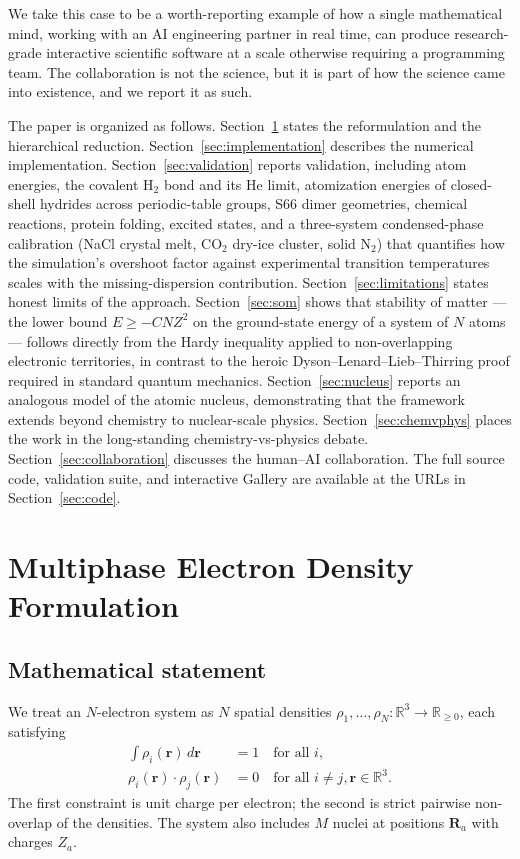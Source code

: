 \documentclass[11pt]{article}
\begin{document}
We take this case to be a worth-reporting example of how a single mathematical mind, working with an AI engineering partner in real time, can produce research-grade interactive scientific software at a scale otherwise requiring a programming team. The collaboration is not the science, but it is part of how the science came into existence, and we report it as such.

The paper is organized as follows. Section~\ref{sec:reformulation} states the reformulation and the hierarchical reduction. Section~\ref{sec:implementation} describes the numerical implementation. Section~\ref{sec:validation} reports validation, including atom energies, the covalent H$_2$ bond and its He limit, atomization energies of closed-shell hydrides across periodic-table groups, S66 dimer geometries, chemical reactions, protein folding, excited states, and a three-system condensed-phase calibration (NaCl crystal melt, CO$_2$ dry-ice cluster, solid N$_2$) that quantifies how the simulation's overshoot factor against experimental transition temperatures scales with the missing-dispersion contribution. Section~\ref{sec:limitations} states honest limits of the approach. Section~\ref{sec:som} shows that stability of matter --- the lower bound $E \ge -C N Z^2$ on the ground-state energy of a system of $N$ atoms --- follows directly from the Hardy inequality applied to non-overlapping electronic territories, in contrast to the heroic Dyson--Lenard--Lieb--Thirring proof required in standard quantum mechanics. Section~\ref{sec:nucleus} reports an analogous model of the atomic nucleus, demonstrating that the framework extends beyond chemistry to nuclear-scale physics. Section~\ref{sec:chemvphys} places the work in the long-standing chemistry-vs-physics debate. Section~\ref{sec:collaboration} discusses the human--AI collaboration. The full source code, validation suite, and interactive Gallery are available at the URLs in Section~\ref{sec:code}.

\section{Multiphase Electron Density Formulation}\label{sec:reformulation}

\subsection{Mathematical statement}

We treat an $N$-electron system as $N$ spatial densities $\rho_1, \ldots, \rho_N : \mathbb{R}^3 \to \mathbb{R}_{\geq 0}$, each satisfying
\begin{align}
\int \rho_i(\mathbf{r})\, d\mathbf{r} &= 1 \quad \text{for all } i, \\
\rho_i(\mathbf{r}) \cdot \rho_j(\mathbf{r}) &= 0 \quad \text{for all } i \neq j, \mathbf{r} \in \mathbb{R}^3.
\end{align}
The first constraint is unit charge per electron; the second is strict pairwise non-overlap of the densities. The system also includes $M$ nuclei at positions $\mathbf{R}_a$ with charges $Z_a$.
\end{document}
